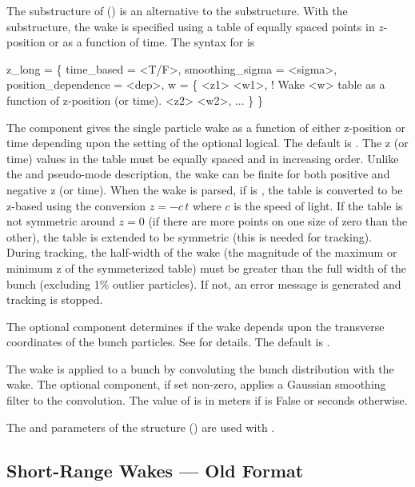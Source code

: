 The  substructure of  () is an alternative to the
 substructure. With the  substructure, the wake is specified using a
table of equally spaced points in $z$-position or as a function of time. The syntax for 
is
\begin{example}
  z_long = \{
    time_based = <T/F>,
    smoothing_sigma = <sigma>,
    position_dependence = <dep>,
    w = \{
      <z1>  <w1>,            ! Wake <w> table as a function of z-position (or time).
      <z2>  <w2>,
      ...
    \}
  \}
\end{example}
The  component gives the single particle wake as a function of either z-position or time
depending upon the setting of the optional  logical. The default is . The z
(or time) values in the  table must be equally spaced and in increasing order. Unlike the
 and  pseudo-mode description, the wake can be finite for both
positive and negative z (or time). When the wake is parsed, if  is , the
table is converted to be z-based using the conversion $z = -c \, t$ where $c$ is the speed of
light. If the table is not symmetric around $z = 0$ (if there are more points on one size of zero
than the other), the table is extended to be symmetric (this is needed for tracking).  During
tracking, the half-width of the wake (the magnitude of the maximum or minimum z of the symmeterized
table) must be greater than the full width of the bunch (excluding 1\% outlier particles). If not,
an error message is generated and tracking is stopped. 

The optional  component determines if the wake depends upon the transverse coordinates
of the bunch particles. See  for details. The default is . 

The wake is applied to a bunch by convoluting the bunch distribution with the wake.  The optional
 component, if set non-zero, applies a Gaussian smoothing filter to the
convolution. The value of  is in meters if  is False or seconds
otherwise.

The  and  parameters of the  structure ()
are used with .

\subsection{Short-Range Wakes --- Old Format}
\label{s:sr.wake.old}

